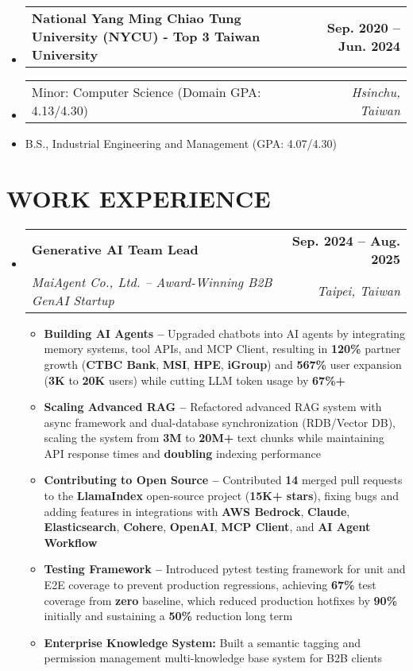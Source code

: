 \documentclass[letterpaper,11pt]{article}
\makeatletter
\newcommand{\resumeItem}[1]{
  \item\small{#1}
}
\newcommand{\resumeSubheadingnull}[2]{
  \item
    \begin{tabular*}{1.0\textwidth}[t]{l@{\extracolsep{\fill}}r}
      \textbf{#1} & \textbf{\small #2} \\
    \end{tabular*}\vspace{3pt}
}
\newcommand{\resumeSubheadinga}[4]{
  \vspace{-3pt}\item
    \begin{tabular*}{1.0\textwidth}[t]{l@{\extracolsep{\fill}}r}
      \textbf{#1} & \textbf{\small #2} \\
      \textit{\small#3} & \textit{\small #4} \\
    \end{tabular*}
}
\newcommand{\resumeSubItema}[2]{
  \item
    \begin{tabular*}{1.0\textwidth}[t]{l@{\extracolsep{\fill}}r}
      \small#1 & \textit{\small #2} \\
    \end{tabular*}
}
\newcommand{\resumeSubItem}[1]{\resumeItem{#1}}
\newcommand{\resumeSubHeadingListStart}{\begin{itemize}[leftmargin=0.0in, label={}]}
\newcommand{\resumeSubHeadingListEnd}{\end{itemize}}
\newcommand{\resumeItemListStart}{\begin{itemize}[label=$\vcenter{\hbox{\tiny$\bullet$}}$]}
\newcommand{\resumeItemListEnd}{\end{itemize}}
\makeatother
\begin{document}
\resumeSubHeadingListStart
\resumeSubheadingnull
{National Yang Ming Chiao Tung University (NYCU) - Top 3 Taiwan University }{Sep. 2020 -- Jun. 2024}
\vspace{-20pt}
\resumeSubItema{Minor: Computer Science (Domain GPA: 4.13/4.30)}{Hsinchu, Taiwan}
\vspace{-15pt}
\resumeSubItem{B.S., Industrial Engineering and Management (GPA: 4.07/4.30)}
\resumeSubHeadingListEnd


\vspace{-6pt}



\section{WORK EXPERIENCE}
\vspace{2pt}
\resumeSubHeadingListStart
\resumeSubheadinga
{Generative AI Team Lead}{Sep. 2024 -- Aug. 2025}
{MaiAgent Co., Ltd. -- Award-Winning B2B GenAI Startup}{Taipei, Taiwan}
\vspace{-6pt}
\resumeItemListStart
\resumeItem{\textbf{Building AI Agents --} Upgraded chatbots into AI agents by integrating memory systems, tool APIs, and MCP Client, resulting in \textbf{120\%} partner growth (\textbf{CTBC Bank}, \textbf{MSI}, \textbf{HPE}, \textbf{iGroup}) and \textbf{567\%} user expansion (\textbf{3K} to \textbf{20K} users) while cutting LLM token usage by \textbf{67\%+}}
\resumeItem{\textbf{Scaling Advanced RAG --} Refactored advanced RAG system with async framework and dual-database synchronization (RDB/Vector DB), scaling the system from \textbf{3M} to \textbf{20M+} text chunks while maintaining API response times and \textbf{doubling} indexing performance}
\resumeItem{\textbf{Contributing to Open Source --} Contributed \textbf{14} merged pull requests to the \textbf{LlamaIndex} open-source project (\textbf{15K+ stars}), fixing bugs and adding features in integrations with \textbf{AWS Bedrock}, \textbf{Claude}, \textbf{Elasticsearch}, \textbf{Cohere}, \textbf{OpenAI}, \textbf{MCP Client}, and \textbf{AI Agent Workflow}}
\resumeItem{\textbf{Testing Framework --} Introduced pytest testing framework for unit and E2E coverage to prevent production regressions, achieving \textbf{67\%} test coverage from \textbf{zero} baseline, which reduced production hotfixes by \textbf{90\%} initially and sustaining a \textbf{50\%} reduction long term}
\resumeItem{\textbf{Enterprise Knowledge System:} Built a semantic tagging and permission management multi-knowledge base system for B2B clients}
\resumeItemListEnd
\resumeSubHeadingListEnd
\end{document}
